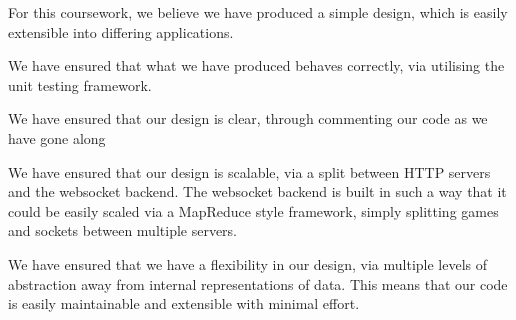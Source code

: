 \documentclass[a4wide, 11pt]{article}
\begin{document}
For this coursework, we believe we have produced a simple design, which is easily extensible into differing applications.

We have ensured that what we have produced behaves correctly, via utilising the unit testing framework. 

We have ensured that our design is clear, through commenting our code as we have gone along

We have ensured that our design is scalable, via a split between HTTP servers and the websocket backend. The websocket backend is built in such a way that it could be easily scaled via a MapReduce style framework, simply splitting games and sockets between multiple servers.

We have ensured that we have a flexibility in our design, via multiple levels of abstraction away from internal representations of data. This means that our code is easily maintainable and extensible with minimal effort.
\end{document}

